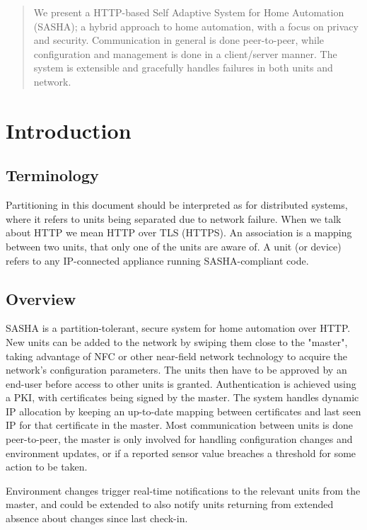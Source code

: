 \begin{abstract}

We present a HTTP-based Self Adaptive System for Home Automation (SASHA); a hybrid approach to home automation, with a focus on privacy and security. Communication in general is done peer-to-peer, while configuration and management is done in a client/server manner. The system is extensible and gracefully handles failures in both units and network.

\end{abstract}


\section{Introduction}

\subsection{Terminology}
Partitioning in this document should be interpreted as for distributed systems, where it refers to units being separated due to network failure. When we talk about HTTP we mean HTTP over TLS (HTTPS). An association is a mapping between two units, that only one of the units are aware of. A unit (or device) refers to any IP-connected appliance running SASHA-compliant code.

\subsection{Overview}
SASHA is a partition-tolerant, secure system for home automation over HTTP. New units can be added to the network by swiping them close to the "master", taking advantage of NFC or other near-field network technology to acquire the network's configuration parameters. The units then have to be approved by an end-user before access to other units is granted. Authentication is achieved using a PKI, with certificates being signed by the master. The system handles dynamic IP allocation by keeping an up-to-date mapping between certificates and last seen IP for that certificate in the master. Most communication between units is done peer-to-peer, the master is only involved for handling configuration changes and environment updates, or if a reported sensor value breaches a threshold for some action to be taken.

Environment changes trigger real-time notifications to the relevant units from the master, and could be extended to also notify units returning from extended absence about changes since last check-in.

